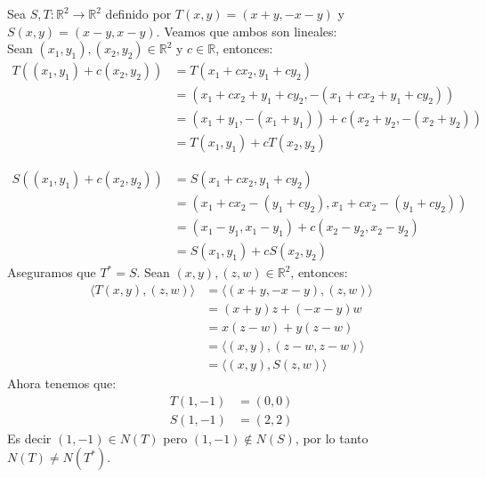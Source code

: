 \documentclass[11pt,letterpaper]{article}
\newcommand{\PrdI}[2]{\ensuremath{\langle #1, #2 \rangle}}
\newcommand{\R}{\mathbb{R}}
\begin{document}
\begin{Solucion}
    Sea $S,T: \R^2 \rightarrow \R^2$ definido por $T(x,y)=(x+y,-x-y)$ y $S(x,y)=(x-y,x-y)$. Veamos que ambos son lineales: \\
    Sean $(x_1,y_1),(x_2,y_2)\in \R^2$ y $c\in \R$, entonces: 
\begin{align*}
    T((x_1,y_1)+c (x_2,y_2)) &= T(x_1+cx_2,y_1+cy_2) \\
    &=(x_1+cx_2+y_1+cy_2,-(x_1+cx_2+y_1+cy_2)) \\
    &=(x_1+y_1,-(x_1+y_1))+c(x_2+y_2,-(x_2+y_2)) \\
    &=T(x_1,y_1)+cT(x_2,y_2)
\end{align*}

\begin{align*}
    S((x_1,y_1)+c (x_2,y_2)) &= S(x_1+cx_2,y_1+cy_2) \\
    &=(x_1+cx_2-(y_1+cy_2),x_1+cx_2-(y_1+cy_2)) \\
    &=(x_1-y_1,x_1-y_1)+c(x_2-y_2,x_2-y_2) \\
    &=S(x_1,y_1)+cS(x_2,y_2)
\end{align*}
    Aseguramos que $T^*=S$. Sean $(x,y),(z,w)\in \R^2$, entonces:
    \begin{align*}
        \PrdI{T(x,y)}{(z,w)} &= \PrdI{(x+y,-x-y)}{(z,w)} \\
        &= (x+y)z + (-x-y)w \\
        &= x(z-w) + y(z-w) \\
        &= \PrdI{(x,y)}{(z-w,z-w)} \\
        &= \PrdI{(x,y)}{S(z,w)}
    \end{align*}
    Ahora tenemos que:
    \begin{align*}
        T(1,-1) &= (0,0) \\
        S(1,-1) &= (2,2)
    \end{align*}
    Es decir $(1,-1)\in N(T)$ pero $(1,-1)\notin N(S)$, por lo tanto $N(T)\neq N(T^*)$.
\end{Solucion}\,\\
\end{document}

